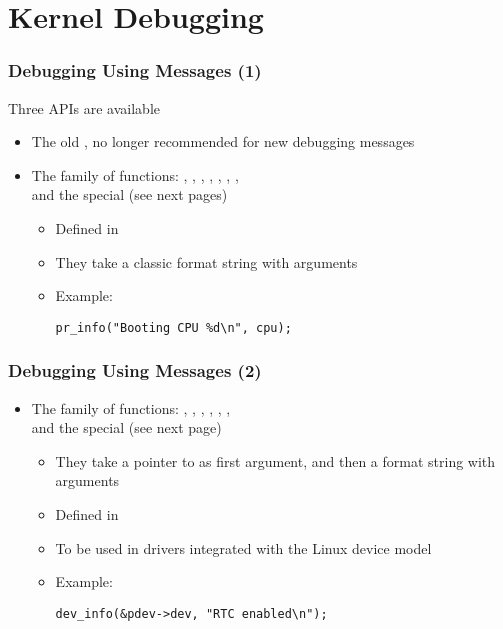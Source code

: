 \section{Kernel Debugging}

\begin{frame}[fragile]
  \frametitle{Debugging Using Messages (1)}
  Three APIs are available
  \begin{itemize}
  \item The old , no longer recommended for new debugging
    messages
  \item The  family of functions: ,
    , , ,
    , , ,
     \\
    and the special  (see next pages)
    \begin{itemize}
    \item Defined in 
    \item They take a classic format string with arguments
    \item Example:
      \begin{verbatim}
pr_info("Booting CPU %d\n", cpu);
      \end{verbatim}
    \end{itemize}
  \end{itemize}
\end{frame}


\begin{frame}[fragile]
  \frametitle{Debugging Using Messages (2)}
  \begin{itemize}
  \item The  family of functions: ,
    , , ,
    , ,  \\
    and the special  (see next page)
    \begin{itemize}
    \item They take a pointer to  as first
      argument, and then a format string with arguments
    \item Defined in 
    \item To be used in drivers integrated with the Linux device
      model
    \item Example:
      \begin{verbatim}
dev_info(&pdev->dev, "RTC enabled\n");
      \end{verbatim}
    \end{itemize}
  \end{itemize}
\end{frame}

